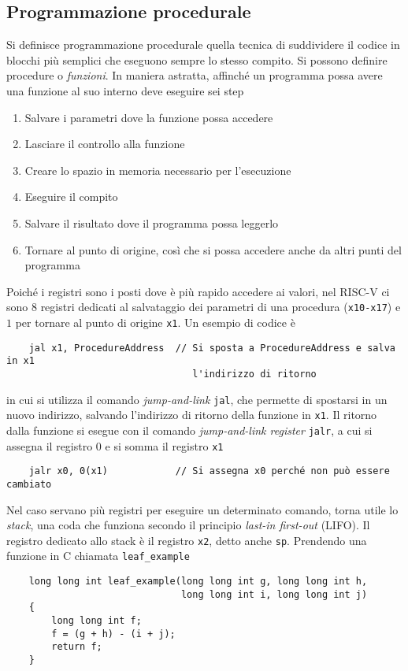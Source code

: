 \documentclass[a4paper,12pt]{article}
\theoremstyle{break}
\newcommand{\code}[1]{\texttt{#1}}
\numberwithin{equation}{section}
\begin{document}
\subsection{Programmazione procedurale}
Si definisce programmazione procedurale quella tecnica di suddividere il codice in blocchi più semplici che eseguono sempre lo stesso compito. Si possono definire procedure o \textit{funzioni}. 
In maniera astratta, affinché un programma possa avere una funzione al suo interno deve eseguire sei step
\begin{enumerate}
    \item Salvare i parametri dove la funzione possa accedere
    \item Lasciare il controllo alla funzione
    \item Creare lo spazio in memoria necessario per l'esecuzione
    \item Eseguire il compito
    \item Salvare il risultato dove il programma possa leggerlo
    \item Tornare al punto di origine, così che si possa accedere anche da altri punti del programma
\end{enumerate}
Poiché i registri sono i posti dove è più rapido accedere ai valori, nel RISC-V ci sono \(8\) registri dedicati al salvataggio dei parametri di una procedura (\code{x10-x17}) e \(1\) per tornare al punto di origine \code{x1}.
Un esempio di codice è
\begin{verbatim}
    jal x1, ProcedureAddress  // Si sposta a ProcedureAddress e salva in x1 
                                 l'indirizzo di ritorno
\end{verbatim}
in cui si utilizza il comando \textit{jump-and-link} \code{jal}, che permette di spostarsi in un nuovo indirizzo, salvando l'indirizzo di ritorno della funzione in \code{x1}.
Il ritorno dalla funzione si esegue con il comando \textit{jump-and-link register} \code{jalr}, a cui si assegna il registro \(0\) e si somma il registro \code{x1}
\begin{verbatim}
    jalr x0, 0(x1)            // Si assegna x0 perché non può essere cambiato
\end{verbatim}
Nel caso servano più registri per eseguire un determinato comando, torna utile lo \textit{stack}, una coda che funziona secondo il principio \textit{last-in first-out} (LIFO). Il registro dedicato allo stack è il registro \code{x2}, detto anche \code{sp}.
Prendendo una funzione in C chiamata \code{leaf\_example}
\begin{verbatim}
    long long int leaf_example(long long int g, long long int h, 
                               long long int i, long long int j)
    {
        long long int f;
        f = (g + h) - (i + j);
        return f;
    }
\end{verbatim}
\end{document}
